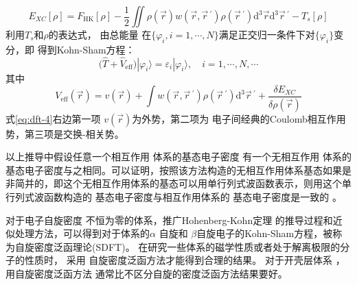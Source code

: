 \begin{equation} 
  \label{eq:dft-2}
  E_{XC}[\rho]=F_{\mathrm{HK}}[\rho]-\frac 12\iint{\rho(\vec{r}) w(\vec{r},\vec r\,^{\prime})\rho(\vec r\,^{\prime})\textrm{d}^3\vec{r}\textrm{d}^3\vec r\,^{\prime}}-T_{s}[\rho]
\end{equation}
利用$T_s$和$\rho$的表达式，%
{由}总能量%
{在$\{\varphi_i, i\!=\!1,\cdots, N\}$满足正交归一条件下对$\{\varphi_i\}$}变分，即%
得到Kohn-Sham方程：
\begin{equation} \label{eq:dft-3}
	\bigl(\hat{T}+\hat{V}_{\mathrm{eff}}\bigr)|\varphi_{i}\rangle=\varepsilon_{i}|\varphi_{i}\rangle{,\quad i=1,\cdots,N,\cdots}
\end{equation}
其中
\begin{equation} \label{eq:dft-4}
	V_{\mathrm{eff}}(\vec{r})={v}(\vec{r})+\int{w(\vec{r},\vec r\,^{\prime})\rho(\vec r\,^{\prime})\textrm{d}^3{\vec r\,^{\prime}}+\frac{\delta E_{XC}}{\delta\rho(\vec{r})
}}
\end{equation}
式\eqref{eq:dft-4}右边第一项%
${v}(\vec{r})
$为外势，第二项为%
{电}子间经典的{Coulomb}相互作用势，第三项是交换-相关势。%

以上推导中假设任意一个相互作用%
{体系的基态电}子密度%
{有一个}无相互作用%
{体系的基态电}子密度{与之相同}。可以证明\cite{PNAS76-6062_1979,IJQC24-243_1983}，按照该方法构造的无相互作用体系基态如果是非简并的，即这个无相互作用体系的基态可以用单行列式波函数表示，则用这个单行列式波函数构造的%
{基态电}子密度与相互作用体系的%
{基态电}子密度是一致的%
。

对于{电子}自旋{密度}%
{不恒为零的体系，推广}Hohenberg-Kohn定理%
{的推导过程和近似处理方法，可以得到对于体系的}$\alpha$%
自旋和%
{$\beta$自旋}电子的{\textrm{Kohn-Sham}方程，被称为自旋密度泛函理论\textrm{(SDFT)}。}%
{在}研究一些体系的磁学性质或者处于解离极限的分子的性质{时}，%
采用%
自旋密度泛函方法才能得到合理的结果{。}%
对于开壳层体系%
，用自旋密度泛函方法%
通常比不{区}分自旋的密度泛函方法结果要好。%


